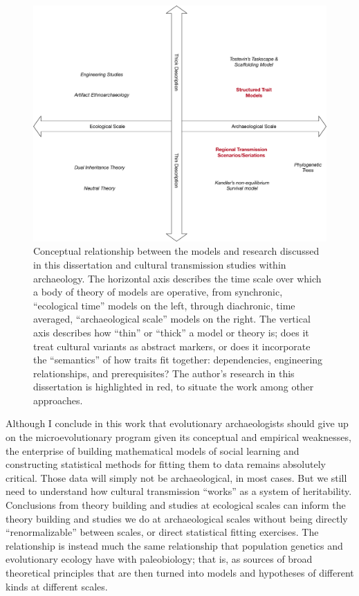 \begin{figure}[ht!]
  \centering
  \includegraphics[scale=0.5]{graphics/conclusion/quadrant-diagram.pdf}
  \caption{Conceptual relationship between the models and research discussed in this dissertation and cultural transmission studies within archaeology.  The horizontal axis describes the time scale over which a body of theory of models are operative, from synchronic, ``ecological time'' models on the left, through diachronic, time averaged, ``archaeological scale'' models on the right.  The vertical axis describes how ``thin'' or ``thick'' a model or theory is; does it treat cultural variants as abstract markers, or does it incorporate the ``semantics'' of how traits fit together:  dependencies, engineering relationships, and prerequisites?  The author's research in this dissertation is highlighted in red, to situate the work among other approaches.}
  \label{conc:fig:quadrant-diagram}
\end{figure}

Although I conclude in this work that evolutionary archaeologists should give up on the microevolutionary program given its conceptual and empirical weaknesses, the enterprise of building mathematical models of social learning and constructing statistical methods for fitting them to data remains absolutely critical.  Those data will simply not be archaeological, in most cases.  But we still need to understand how cultural transmission ``works'' as a system of heritability.  Conclusions from theory building and studies at ecological scales can inform the theory building and studies we do at archaeological scales without being directly ``renormalizable'' between scales, or direct statistical fitting exercises.  The relationship is instead much the same relationship that population genetics and evolutionary ecology have with paleobiology; that is, as sources of broad theoretical principles that are then turned into models and hypotheses of different kinds at different scales.

